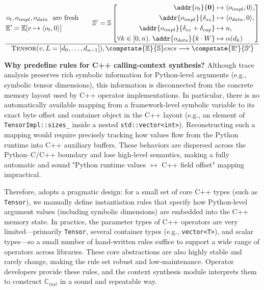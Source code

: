 \begin{equation}
  \frac{
    \begin{aligned}
      o_{t}&, o_{impl}, o_{data}~ \text{ are fresh} \\
      \mathbb{E}'& = \mathbb{E}[v \mapsto \langle o_t, 0 \rangle]
    \end{aligned}
    \qquad
    \mathbb{S}' = \mathbb{S} \left[ 
      \begin{aligned}
        \addr{o_{t}}{\mathbf{0}} & \mapsto \langle o_{impl}, 0 \rangle, \\
        \addr{o_{impl}}{\delta_{sz}} & \mapsto \langle o_{data}, 0 \rangle, \\
        \addr{o_{impl}}{\delta_{sz} + \delta_{cap}} & \mapsto n, \\
        \forall k \in [0, n).\; \addr{o_{data}}{k \cdot W} & \mapsto \alpha(d_k)
      \end{aligned}
    \right]
  }{
    \textsc{Tensor}(v, L= [d_0, \dots, d_{n-1}]), \compstate{\mathbb{E}}{\mathbb{S}} cscs
    \longrightarrow \compstate{\mathbb{E}'}{\mathbb{S}'}
  }
\end{equation}

\textbf{Why predefine rules for C++ calling-context synthesis?}
Although trace analysis preserves rich symbolic information for Python-level arguments (e.g., symbolic tensor dimensions), this information is disconnected from the concrete memory layout used by C++ operator implementations.
In particular, there is no automatically available mapping from a framework-level symbolic variable to its exact byte offset and container object in the C++ layout (e.g., an element of \texttt{TensorImpl::sizes\_} inside a nested \texttt{std::vector<int>}).
Reconstructing such a mapping would require precisely tracking how values flow from the Python runtime into C++ auxiliary buffers.
These behaviors are dispersed across the Python–C/C++ boundary and lose high-level semantics, making a fully automatic and sound "Python runtime values $\leftrightarrow$ C++ field offset" mapping impractical.

Therefore, \mysys adopts a pragmatic design: for a small set of core C++ types (such as \texttt{Tensor}), we manually define instantiation rules that specify how Python-level argument values (including symbolic dimensions) are embedded into the C++ memory state.
In practice, the parameter types of C++ operators are very limited—primarily \texttt{Tensor}, several container types (e.g., \texttt{vector<T>}), and scalar types—so a small number of hand-written rules suffice to support a wide range of operators across libraries.
These core abstractions are also highly stable and rarely change, making the rule set robust and low-maintenance.
Operator developers provide these rules, and the context synthesis module interprets them to construct $\mathbb{C}_{init}$ in a sound and repeatable way.

